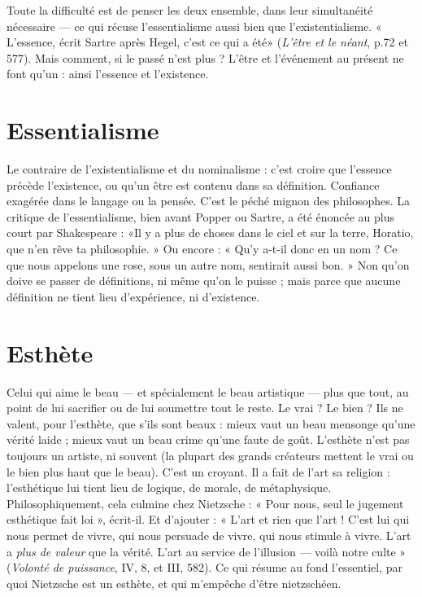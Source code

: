 Toute la difficulté est de penser les deux ensemble, dans leur simultanéité
nécessaire — ce qui récuse l’essentialisme aussi bien que l’existentialisme. « L’essence,
écrit Sartre après Hegel, c’est ce qui a été» ({\it L'être et le néant}, p.72
et 577). Mais comment, si le passé n’est plus ? L’être et l'événement au présent
ne font qu’un : ainsi l'essence et l’existence.

\section{Essentialisme}
Le contraire de l’existentialisme et du nominalisme : c’est
croire que l'essence précède l'existence, ou qu’un être est
contenu dans sa définition. Confiance exagérée dans le langage ou la pensée.
C’est le péché mignon des philosophes. La critique de l’essentialisme, bien
avant Popper ou Sartre, a été énoncée au plus court par Shakespeare : «Il y a
plus de choses dans le ciel et sur la terre, Horatio, que n’en rêve ta
philosophie. » Ou encore : « Qu’y a-t-il donc en un nom ? Ce que nous appelons
une rose, sous un autre nom, sentirait aussi bon. » Non qu’on doive se
passer de définitions, ni même qu’on le puisse ; mais parce que aucune définition
ne tient lieu d’expérience, ni d’existence.

\section{Esthète}
Celui qui aime le beau — et spécialement le beau artistique — plus
que tout, au point de lui sacrifier ou de lui soumettre tout le
reste. Le vrai ? Le bien ? Ils ne valent, pour l’esthète, que s’ils sont beaux :
mieux vaut un beau mensonge qu’une vérité laide ; mieux vaut un beau crime
qu’une faute de goût. L’esthète n’est pas toujours un artiste, ni souvent (la plupart
des grands créateurs mettent le vrai ou le bien plus haut que le beau). C’est
un croyant. Il a fait de l’art sa religion : l'esthétique lui tient lieu de logique, de
morale, de métaphysique. Philosophiquement, cela culmine chez Nietzsche :
« Pour nous, seul le jugement esthétique fait loi », écrit-il. Et d’ajouter : « L'art
et rien que l’art ! C’est lui qui nous permet de vivre, qui nous persuade de vivre,
qui nous stimule à vivre. L'art a {\it plus de valeur} que la vérité. L'art au service
de l'illusion — voilà notre culte » ({\it Volonté de puissance}, IV, 8, et III, 582). Ce
qui résume au fond l'essentiel, par quoi Nietzsche est un esthète, et qui
m’empêche d’être nietzschéen.

